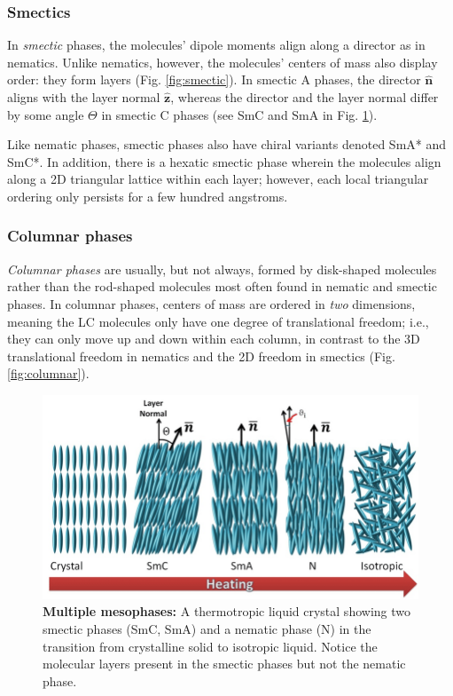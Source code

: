 \documentclass[twocolumn,aps,prl]{revtex4-1} %
\begin{document}
\subsubsection{Smectics}

In \textit{smectic} phases, the molecules' dipole moments align along a director as in nematics.  Unlike nematics, however, the molecules' centers of mass also display order: they form layers (Fig. \ref{fig:smectic}).  In smectic A phases, the director $\hat{\mathbf{n}}$ aligns with the layer normal $\hat{\mathbf{z}}$, whereas the director and the layer normal differ by some angle $\Theta$ in smectic C phases (see SmC and SmA in Fig. \ref{fig:phases}).

Like nematic phases, smectic phases also have chiral variants denoted SmA* and SmC*.  In addition, there is a hexatic smectic phase wherein the molecules align along a 2D triangular lattice within each layer; however, each local triangular ordering only persists for a few hundred angstroms.

\subsubsection{Columnar phases}

\textit{Columnar phases} are usually, but not always, formed by disk-shaped molecules rather than the rod-shaped molecules most often found in nematic and smectic phases.  In columnar phases, centers of mass are ordered in \textit{two} dimensions, meaning the LC molecules only have one degree of translational freedom; i.e., they can only move up and down within each column, in contrast to the 3D translational freedom in nematics and the 2D freedom in smectics (Fig. \ref{fig:columnar}).

\begin{figure}
	\centering    
    \includegraphics[scale=0.5]{phases.png}
    \caption{\textbf{Multiple mesophases:} \cite{al-zangana_lyotropic_2017} A thermotropic liquid crystal showing two smectic phases (SmC, SmA) and a nematic phase (N) in the transition from crystalline solid to isotropic liquid. Notice the molecular layers present in the smectic phases but not the nematic phase.}
    \label{fig:phases}
\end{figure}
\end{document}
